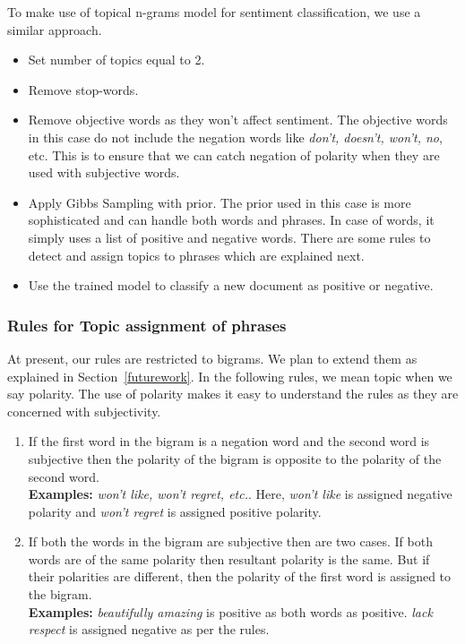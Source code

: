 \documentclass[11pt]{article}
\begin{document}
To make use of topical n-grams model for sentiment classification, we use a similar approach.

\begin{itemize}
 \itemsep0em
 \item Set number of topics equal to 2.
 \item Remove stop-words.
 \item Remove objective words as they won't affect sentiment. The objective words in this
 case do not include the negation words like \textit{don't, doesn't, won't, no}, etc. This is to
 ensure that we can catch negation of polarity when they are used with subjective words.
 \item Apply Gibbs Sampling with prior. The prior used in this case is more sophisticated and can
 handle both words and phrases. In case of words, it simply uses a list of positive and negative
 words. There are some rules to detect and assign topics to phrases which are explained next.
 \item Use the trained model to classify a new document as positive or negative.
\end{itemize}

\subsubsection*{Rules for Topic assignment of phrases}

At present, our rules are restricted to bigrams. We plan to extend them as explained in Section~\ref{futurework}.
In the following rules, we mean topic when we say polarity. The use of polarity makes it easy to understand
the rules as they are concerned with subjectivity.

\begin{enumerate}
 \itemsep0em
 \item If the first word in the bigram is a negation word and the second word is subjective then the polarity
 of the bigram is opposite to the polarity of the second word. \\
 \textbf{Examples:} \textit{won't like, won't regret, etc.}. Here, \textit{won't like} is assigned negative
 polarity and \textit{won't regret} is assigned positive polarity.
 \item If both the words in the bigram are subjective then are two cases. If both words are of the same polarity
 then resultant polarity is the same. But if their polarities are different, then the polarity of the first word
 is assigned to the bigram. \\
 \textbf{Examples:} \textit{beautifully amazing} is positive as both words as positive. \textit{lack respect} is
 assigned negative as per the rules.
\end{enumerate}
\end{document}
